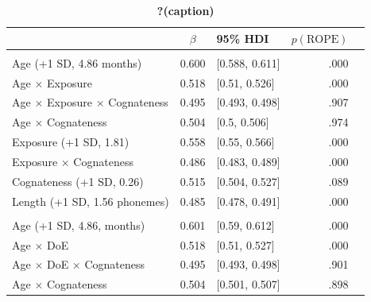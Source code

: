 \documentclass[
]{article}
\begin{document}
\begin{table}

\caption{\label{tbl-coefs-doe}\textbf{?(caption)}}\begin{minipage}[t]{\linewidth}
\subcaption{\label{tbl-coefs-doe-1}}

{\centering 

\begin{tabular}{lclrl}
\toprule
 & $\beta$ & 95\% HDI & $p(\text{ROPE})$ & \\
\midrule
\addlinespace[0.3em]
\multicolumn{5}{l}{\textbf{Model: Exposure}}\\
\hspace{1em}Age (+1 SD, 4.86 months) & 0.600 & {}[0.588, 0.611] & .000 & \\
\hspace{1em}Age $\times$ Exposure & 0.518 & {}[0.51, 0.526] & .000 & \\
\hspace{1em}Age $\times$ Exposure $\times$ Cognateness & 0.495 & {}[0.493, 0.498] & .907 & \\
\hspace{1em}Age $\times$ Cognateness & 0.504 & {}[0.5, 0.506] & .974 & \\
\hspace{1em}Exposure (+1 SD, 1.81) & 0.558 & {}[0.55, 0.566] & .000 & \\
\hspace{1em}Exposure $\times$ Cognateness & 0.486 & {}[0.483, 0.489] & .000 & \\
\hspace{1em}Cognateness (+1 SD, 0.26) & 0.515 & {}[0.504, 0.527] & .089 & \\
\hspace{1em}Length (+1 SD, 1.56 phonemes) & 0.485 & {}[0.478, 0.491] & .000 & \\
\addlinespace[0.3em]
\multicolumn{5}{l}{\textbf{Model: Frequency \& DoE}}\\
\hspace{1em}Age (+1 SD, 4.86, months) & 0.601 & {}[0.59, 0.612] & .000 & \\
\hspace{1em}Age $\times$ DoE & 0.518 & {}[0.51, 0.527] & .000 & \\
\hspace{1em}Age $\times$ DoE $\times$ Cognateness & 0.495 & {}[0.493, 0.498] & .901 & \\
\hspace{1em}Age $\times$ Cognateness & 0.504 & {}[0.501, 0.507] & .898 & \\

\end{tabular}}
\end{minipage}
\end{table}
\end{document}
